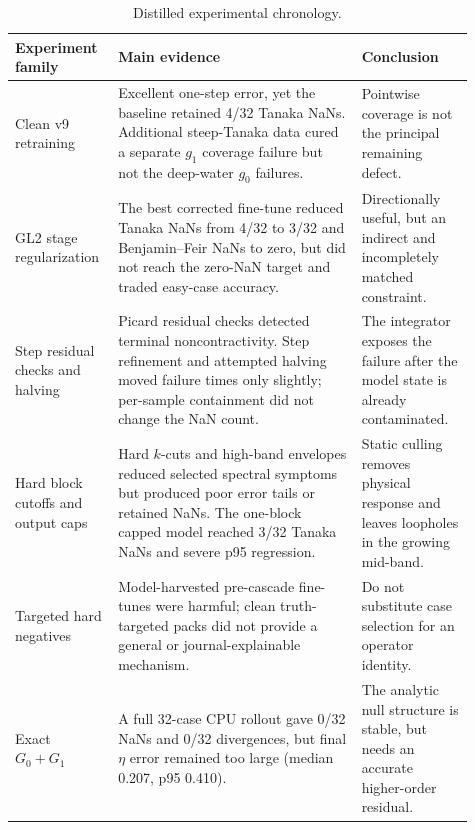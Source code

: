 \documentclass[11pt]{article}
\begin{document}
\begin{table}[ht]
\centering
\small
\begin{tabular}{p{0.18\linewidth}p{0.50\linewidth}p{0.23\linewidth}}
\toprule
Experiment family & Main evidence & Conclusion \\
\midrule
Clean v9 retraining & Excellent one-step error, yet the baseline retained
4/32 Tanaka NaNs.  Additional steep-Tanaka data cured a separate \(g_1\)
coverage failure but not the deep-water \(g_0\) failures. & Pointwise coverage
is not the principal remaining defect. \\

GL2 stage regularization & The best corrected fine-tune reduced Tanaka NaNs
from 4/32 to 3/32 and Benjamin--Feir NaNs to zero, but did not reach the
zero-NaN target and traded easy-case accuracy. & Directionally useful, but an
indirect and incompletely matched constraint. \\

Step residual checks and halving & Picard residual checks detected terminal
noncontractivity.  Step refinement and attempted halving moved failure times
only slightly; per-sample containment did not change the NaN count. & The
integrator exposes the failure after the model state is already contaminated. \\

Hard block cutoffs and output caps & Hard \(k\)-cuts and high-band envelopes
reduced selected spectral symptoms but produced poor error tails or retained
NaNs.  The one-block capped model reached 3/32 Tanaka NaNs and severe p95
regression. & Static culling removes physical response and leaves loopholes in
the growing mid-band. \\

Targeted hard negatives & Model-harvested pre-cascade fine-tunes were harmful;
clean truth-targeted packs did not provide a general or journal-explainable
mechanism. & Do not substitute case selection for an operator identity. \\

Exact \(G_0+G_1\) & A full 32-case CPU rollout gave 0/32 NaNs and 0/32
divergences, but final \(\eta\) error remained too large (median 0.207, p95
0.410). & The analytic null structure is stable, but needs an accurate
higher-order residual. \\
\bottomrule
\end{tabular}
\caption{Distilled experimental chronology.}
\label{tab:history}
\end{table}
\end{document}
